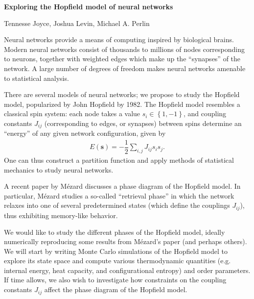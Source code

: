 \documentclass[12pt]{revtex4-1}
\newcommand{\f}[2]{\dfrac{#1}{#2}} %
\newcommand{\p}[1]{\left(#1\right)} %
\renewcommand{\set}[1]{\left\{#1\right\}} %
\renewcommand{\v}{\bm} %
\begin{document}
\begin{center}
  \large \bf Exploring the Hopfield model of neural networks
\end{center}

\begin{center}
  Tennesse Joyce, Joshua Levin, Michael A. Perlin
\end{center}

Neural networks provide a means of computing inspired by biological
brains. Modern neural networks consist of thousands to millions of
nodes corresponding to neurons, together with weighted edges which
make up the ``synapses'' of the network. A large number of degrees of
freedom makes neural networks amenable to statistical analysis.

There are several models of neural networks; we propose to study the
Hopfield model, popularized by John Hopfield by 1982. The Hopfield
model resembles a classical spin system: each node takes a value
$s_i\in\set{1,-1}$, and coupling constants $J_{ij}$ (corresponding to
edges, or synapses) between spins determine an ``energy'' of any given
network configuration, given by
\begin{align}
  E\p{\v s} = -\f12\sum_{i,j} J_{ij}s_is_j.
\end{align}
One can thus construct a partition function and apply methods of
statistical mechanics to study neural networks.

A recent paper by M\'ezard\cite{mezard2017mean} discusses a phase
diagram of the Hopfield model. In particular, M\'ezard studies a
so-called ``retrieval phase'' in which the network relaxes into one of
several predetermined states (which define the couplings $J_{ij}$),
thus exhibiting memory-like behavior.

We would like to study the different phases of the Hopfield model,
ideally numerically reproducing some results from M\'ezard's paper
(and perhaps others)\cite{amit1985storing,tanaka1998mean}. We will
start by writing Monte Carlo simulations of the Hopfield model to
explore its state space and compute various thermodynamic quantities
(e.g. internal energy, heat capacity, and configurational entropy) and
order parameters. If time allows, we also wish to investigate how
constraints on the coupling constants $J_{ij}$ affect the phase
diagram of the Hopfield model.


\end{document}
